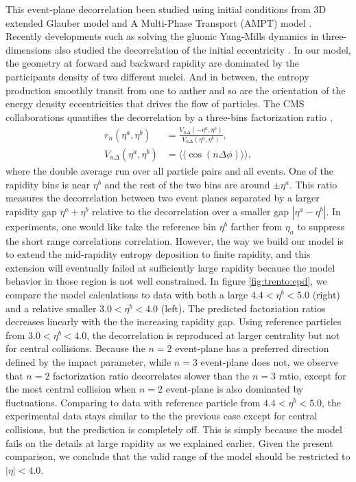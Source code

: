 This event-plane decorrelation been studied using initial conditions from 3D extended Glauber model \cite{Bozek:2015bna} and A Multi-Phase Transport (AMPT) model \cite{Jia:2014ysa, Xiao:2012uw,Pang:2015zrq}.
Recently developments such as solving the gluonic Yang-Mills dynamics in three-dimensions also studied the decorrelation of the initial eccentricity \cite{Schenke:2016ksl}.
In our model, the geometry at forward and backward rapidity are dominated by the participants density of two different nuclei.
And in between, the entropy production smoothly transit from one to anther and so are the orientation of the energy density eccentricities that drives the flow of particles.
The CMS collaborations quantifies the decorrelation by a three-bins factorization ratio \cite{Khachatryan:2015oea},
\begin{eqnarray}
r_n(\eta^a, \eta^b) &= \frac{V_{n\Delta}(-\eta^a, \eta^b)}{V_{n\Delta}(\eta^a, \eta^b)}, \\
V_{n\Delta}(\eta^a, \eta^b) &= \langle\langle \cos(n\Delta\phi) \rangle\rangle,
\end{eqnarray}
where the double average run over all particle pairs and all events.
One of the rapidity bins is near $\eta^b$ and the rest of the two bins are around $\pm\eta^a$.
This ratio measures the decorrelation between two event planes separated by a larger rapidity gap $\eta^a + \eta^b$ relative to the decorrelation over a smaller gap $|\eta^a - \eta^b|$.
In experiments, one would like take the reference bin $\eta^b$ farther from $\eta_a$ to suppress the short range correlations correlation.
However, the way we build our model is to extend the mid-rapidity entropy deposition to finite rapidity, and this extension will eventually failed at sufficiently large rapidity because the model behavior in those region is not well constrained.
In figure \ref{fig:trento:epd}, we compare the model calculations to data with both a large $4.4<\eta^b<5.0$ (right) and a relative smaller $3.0 < \eta^b< 4.0$ (left).
The predicted factoziation ratios decreases linearly with the the increasing rapidity gap.
Using reference particles from $3.0 < \eta^b< 4.0$, the decorrelation is reproduced at larger centrality but not for central collisions.
Because the $n=2$ event-plane has a preferred direction defined by the impact parameter, while $n=3$ event-plane does not, we observe that $n=2$ factorization ratio decorrelates slower than the $n=3$ ratio, except for the most central collision when $n=2$ event-plane is also dominated by fluctuations.
Comparing to data with reference particle from $4.4<\eta^b<5.0$, the experimental data stays similar to the the previous case except for central collisions, but the prediction is completely off.
This is simply because the model fails on the details at large rapidity as we explained earlier.
Given the present comparison, we conclude that the valid range of the model should be restricted to $|\eta| < 4.0$.

